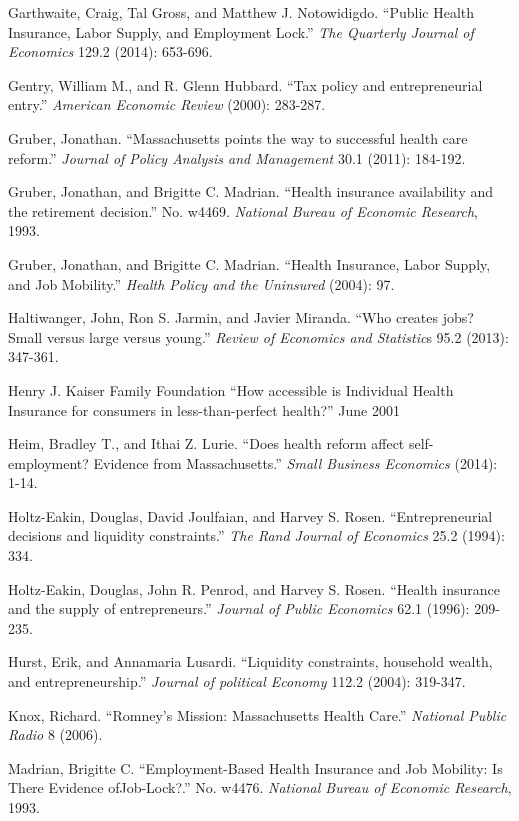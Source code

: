 \begin{singlespace}
\begin{thebibliography}{99}
Garthwaite, Craig, Tal Gross, and Matthew J. Notowidigdo. ``Public Health Insurance, Labor Supply, and Employment Lock.'' \emph{The Quarterly Journal of Economics} 129.2 (2014): 653-696.

Gentry, William M., and R. Glenn Hubbard. ``Tax policy and entrepreneurial entry.'' \emph{American Economic Review} (2000): 283-287.

Gruber, Jonathan. ``Massachusetts points the way to successful health care reform.'' \emph{Journal of Policy Analysis and Management} 30.1 (2011): 184-192.

Gruber, Jonathan, and Brigitte C. Madrian. ``Health insurance availability and the retirement decision.'' No. w4469. \emph{National Bureau of Economic Research}, 1993.

Gruber, Jonathan, and Brigitte C. Madrian. ``Health Insurance, Labor Supply, and Job Mobility.'' \emph{Health Policy and the Uninsured} (2004): 97.

Haltiwanger, John, Ron S. Jarmin, and Javier Miranda. ``Who creates jobs? Small versus large versus young.'' \emph{Review of Economics and Statistic}s 95.2 (2013): 347-361.

Henry J. Kaiser Family Foundation ``How accessible is Individual Health Insurance for consumers in less-than-perfect health?'' June 2001

Heim, Bradley T., and Ithai Z. Lurie. ``Does health reform affect self-employment? Evidence from Massachusetts.'' \emph{Small Business Economics} (2014): 1-14.

Holtz-Eakin, Douglas, David Joulfaian, and Harvey S. Rosen. ``Entrepreneurial decisions and liquidity constraints.'' \emph{The Rand Journal of Economics} 25.2 (1994): 334.

Holtz-Eakin, Douglas, John R. Penrod, and Harvey S. Rosen. ``Health insurance and the supply of entrepreneurs.'' \emph{Journal of Public Economics} 62.1 (1996): 209-235.

Hurst, Erik, and Annamaria Lusardi. ``Liquidity constraints, household wealth, and entrepreneurship.'' \emph{Journal of political Economy} 112.2 (2004): 319-347.

Knox, Richard. ``Romney's Mission: Massachusetts Health Care.'' \emph{National Public Radio} 8 (2006).

Madrian, Brigitte C. ``Employment-Based Health Insurance and Job Mobility: Is There Evidence ofJob-Lock?.'' No. w4476. \emph{National Bureau of Economic Research}, 1993.


\end{thebibliography}
\end{singlespace}
